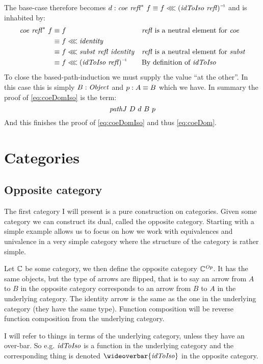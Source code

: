The base-case therefore becomes
$d \tp \var{coe}\ \refl^*\ f \equiv f \lll \inv{(\idToIso\ \refl)}$
and is inhabited by:
\begin{align*}
\var{coe}\ \refl^*\ f
& \equiv f
  && \text{$\refl$ is a neutral element for $\var{coe}$}\\
& \equiv f \lll \identity \\
& \equiv f \lll \var{subst}\ \refl\ \identity
  && \text{$\refl$ is a neutral element for $\var{subst}$}\\
& \equiv f \lll \inv{(\idToIso\ \refl)}
  && \text{By definition of $\idToIso$}\\
\end{align*}
%
To close the based-path-induction we must supply the value ``at the other''. In
this case this is simply $B \tp \Object$ and $p \mathrel{:} A \equiv B$ which we have.
In summary the proof of \ref{eq:coeDomIso} is the term:
%
\begin{equation}
\label{eq:pathJ-example}
\pathJ\ D\ d\ B\ p
\end{equation}
%
And this finishes the proof of \ref{eq:coeDomIso} and thus \ref{eq:coeDom}.
%
\section{Categories}
\subsection{Opposite category}
\label{op-cat}
The first category I will present is a pure construction on categories. Given
some category we can construct its dual, called the opposite category. Starting
with a simple example allows us to focus on how we work with equivalences and
univalence in a very simple category where the structure of the category is
rather simple.

Let $\mathbb{C}$ be some category, we then define the opposite category
$\mathbb{C}^{\mathit{Op}}$. It has the same objects, but the type of arrows are flipped,
that is to say an arrow from $A$ to $B$ in the opposite category corresponds to
an arrow from $B$ to $A$ in the underlying category. The identity arrow is the
same as the one in the underlying category (they have the same type). Function
composition will be reverse function composition from the underlying category.

I will refer to things in terms of the underlying category, unless they have an
over-bar. So e.g. $\idToIso$ is a function in the underlying category and the
corresponding thing is denoted $\wideoverbar{\idToIso}$ in the opposite
category.

